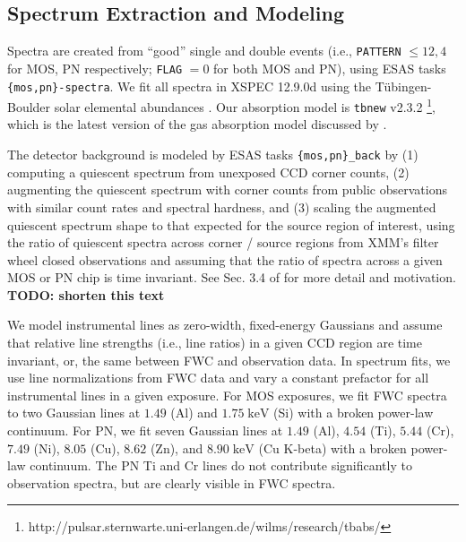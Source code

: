\documentclass[preprint2,tighten,trackchanges]{aastex6}
\newcommand*{\mt}{\mathrm}
\newcommand*{\unit}[1]{\;\mt{#1}}  %
\begin{document}
\subsection{Spectrum Extraction and Modeling}

Spectra are created from ``good'' single and double events (i.e.,
\texttt{PATTERN} $\leq 12,4$ for MOS, PN respectively; \texttt{FLAG} $= 0$ for
both MOS and PN), using ESAS tasks \texttt{\{mos,pn\}-spectra}.
We fit all spectra in XSPEC 12.9.0d \citep{arnaud1996}
using the T{\"u}bingen-Boulder solar elemental abundances
\citep{wilms2000}.
Our absorption model is \texttt{tbnew} v2.3.2
\footnote{http://pulsar.sternwarte.uni-erlangen.de/wilms/research/tbabs/},
which is the latest version of the gas absorption model discussed by
\citet{wilms2000}.

The detector background is modeled by ESAS tasks \texttt{\{mos,pn\}\_back}
by (1) computing a quiescent spectrum from unexposed CCD corner counts,
(2) augmenting the quiescent spectrum with corner counts from public
observations with similar count rates and spectral hardness, and (3) scaling
the augmented quiescent spectrum shape to that expected for the source region
of interest, using the ratio of quiescent spectra across corner / source
regions from XMM's filter wheel closed observations and assuming that the ratio
of spectra across a given MOS or PN chip is time invariant.
See Sec. 3.4 of \citet{kuntz2008} for more detail and motivation.
\textbf{TODO: shorten this text}

We model instrumental lines as zero-width, fixed-energy Gaussians and assume
that relative line strengths (i.e., line ratios) in a given CCD region are time
invariant, or, the same between FWC and observation data.
In spectrum fits, we use line normalizations from FWC data and vary a constant
prefactor for all instrumental lines in a given exposure.
For MOS exposures, we fit FWC spectra to two Gaussian lines at $1.49$ (Al) and
$1.75 \unit{keV}$ (Si) with a broken power-law continuum.
For PN, we fit seven Gaussian lines at $1.49$ (Al), $4.54$ (Ti), $5.44$ (Cr),
$7.49$ (Ni), $8.05$ (Cu), $8.62$ (Zn), and $8.90 \unit{keV}$ (Cu K-beta) with a
broken power-law continuum.
The PN Ti and Cr lines do not contribute significantly to observation spectra,
but are clearly visible in FWC spectra.
\end{document}
